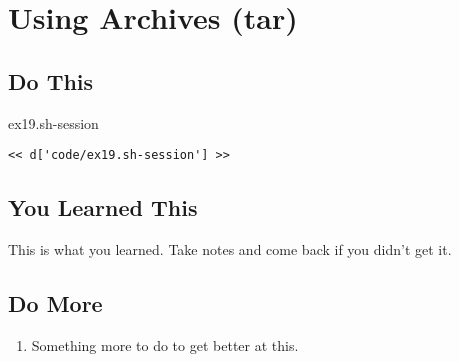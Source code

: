 \chapter{Using Archives (tar)}

\section{Do This}

\begin{code}{ex19.sh-session}
\begin{Verbatim}
<< d['code/ex19.sh-session'] >>
\end{Verbatim}
\end{code}


\section{You Learned This}

This is what you learned.  Take notes and come back if you didn't get it.

\section{Do More}

\begin{enumerate}
\item Something more to do to get better at this.
\end{enumerate}

